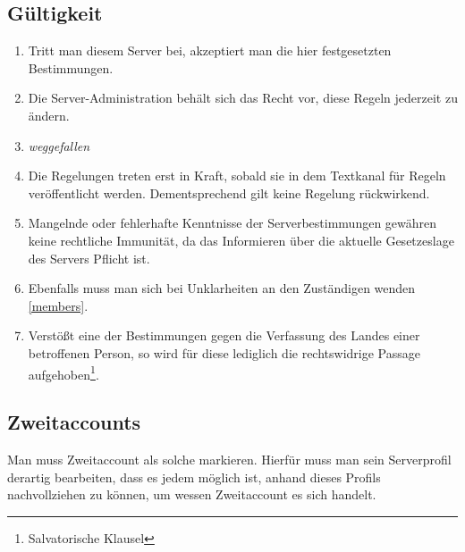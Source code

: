 \documentclass{article}
\begin{document}
\subsection{Gültigkeit}
\begin{enumerate}[(1)]
	\item Tritt man diesem Server bei, akzeptiert man die hier festgesetzten Bestimmungen.
	\item Die Server-Administration behält sich das Recht vor, diese Regeln jederzeit zu ändern.
	\item \textit{weggefallen}
	\item Die Regelungen treten erst in Kraft, sobald sie in dem Textkanal für Regeln veröffentlicht werden. Dementsprechend gilt keine Regelung rückwirkend.
	\item Mangelnde oder fehlerhafte Kenntnisse der Serverbestimmungen gewähren keine rechtliche Immunität, da das Informieren über die aktuelle Gesetzeslage des Servers Pflicht ist.
	\item Ebenfalls muss man sich bei Unklarheiten an den Zuständigen wenden \ref{members}.
	\item Verstößt eine der Bestimmungen gegen die Verfassung des Landes einer betroffenen Person, so wird für diese lediglich die rechtswidrige Passage aufgehoben\footnote{Salvatorische Klausel}.	
\end{enumerate}

\subsection{Zweitaccounts}
Man muss Zweitaccount als solche markieren. Hierfür muss man sein Serverprofil derartig bearbeiten, dass es jedem möglich ist, anhand dieses Profils nachvollziehen zu können, um wessen Zweitaccount es sich handelt.
\end{document}
